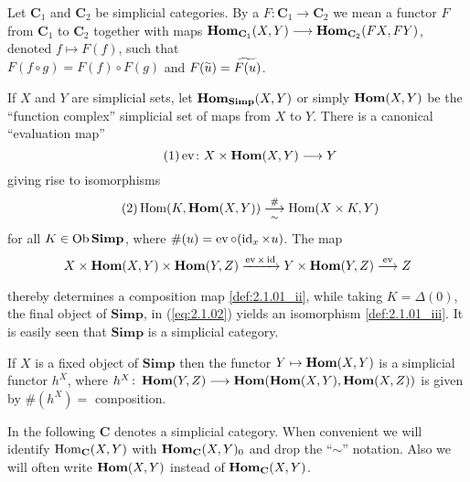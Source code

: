 \documentclass[../main]{subfiles}
\begin{document}
\begin{definition}
Let $\mathbf C_1$ and $\mathbf C_2$ be simplicial categories. By a  $F \colon \mathbf C_1 \longrightarrow \mathbf C_2$ we mean a functor $F$ from $\mathbf C_1$ to $\mathbf C_2$ together with maps $\operatorname{\mathbf{Hom}}_{\mathbf C_1} (X,Y) \longrightarrow \operatorname{\mathbf{Hom}}_{\mathbf C_2}(FX,FY)$, denoted $f \mapsto F(f)$, such that \\$F(f \circ g) = F(f) \circ F(g)$ and $F(\xtilde u) = \xtilde{F(u)}$.
\end{definition}

\begin{example*}
If $X$ and $Y$ are simplicial sets, let $\operatorname{\mathbf{Hom}}_{\mathbf{Simp}}(X,Y)$ or simply $\operatorname{\mathbf{Hom}}(X,Y)$ be the ``function complex'' simplicial set of maps from $X$ to $Y$. There is a canonical ``evaluation map''
\begin{equation}\tag{1}\label{eq:2.1.1}
    \operatorname{ev} \colon X \times \operatorname{\mathbf{Hom}}(X,Y) \longrightarrow Y
\end{equation}
giving rise to isomorphisms
\begin{equation}\tag{2}
\label{eq:2.1.02}
    \Hom(K, \UHom(X,Y)) \varrightarrow[\sim]{\#} \Hom(X \times K, Y)
\end{equation}
for all $K \in \operatorname{Ob} \mathbf{Simp}$, where $\#(u) = \operatorname{ev}  \circ (\operatorname{id}_x \times u)$. The map 
\[X \times \UHom(X,Y) \times \UHom(Y,Z) \varrightarrow{\ev \times \id} Y \times\UHom(Y, Z) \varrightarrow{\ev} Z
\]
thereby determines a composition map \ref{def:2.1.01_ii}, while taking $K=\Delta(0)$, the final object of $\mathbf{Simp}$, in (\ref{eq:2.1.02}) yields an isomorphism \ref{def:2.1.01_iii}. It is easily seen that $\mathbf{Simp}$ is a simplicial category. 

If $X$ is a fixed object of $\mathbf{Simp}$ then the functor $Y \mapsto \operatorname{\mathbf{Hom}}(X, Y)$ is a simplicial functor $h^X$, where $h^X \colon \operatorname{\mathbf{Hom}}(Y,Z) \longrightarrow \operatorname{\mathbf{Hom}}(\operatorname{\mathbf{Hom}}(X,Y), \operatorname{\mathbf{Hom}}(X,Z))$ is given by $\#(h^X) =$ composition.
\end{example*}

In the following $\mathbf C$ denotes a simplicial category. When convenient we will identify $\operatorname{Hom}_{\mathbf C}(X,Y)$ with $\operatorname{\mathbf{Hom}}_{\mathbf C}(X,Y)_0$ and drop the ``$\sim$'' notation. Also we will often write $\operatorname{\mathbf{Hom}}(X,Y)$ instead of $\operatorname{\mathbf{Hom}}_{\mathbf C}(X,Y)$. 
\end{document}
